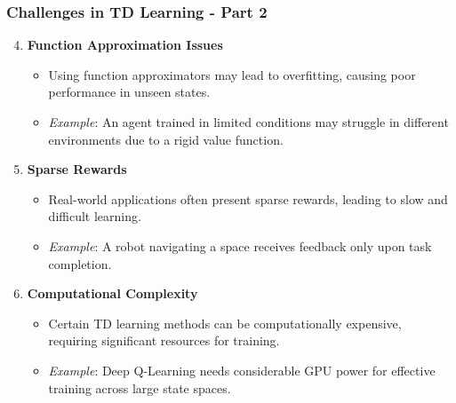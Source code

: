 \documentclass[aspectratio=169]{beamer}
\begin{document}
\begin{frame}[fragile]
    \frametitle{Challenges in TD Learning - Part 2}
    \begin{enumerate}
        \setcounter{enumi}{3}
        \item \textbf{Function Approximation Issues}
        \begin{itemize}
            \item Using function approximators may lead to overfitting, causing poor performance in unseen states.
            \item \textit{Example}: An agent trained in limited conditions may struggle in different environments due to a rigid value function.
        \end{itemize}

        \item \textbf{Sparse Rewards}
        \begin{itemize}
            \item Real-world applications often present sparse rewards, leading to slow and difficult learning.
            \item \textit{Example}: A robot navigating a space receives feedback only upon task completion.
        \end{itemize}

        \item \textbf{Computational Complexity}
        \begin{itemize}
            \item Certain TD learning methods can be computationally expensive, requiring significant resources for training.
            \item \textit{Example}: Deep Q-Learning needs considerable GPU power for effective training across large state spaces.
        \end{itemize}
    \end{enumerate}
\end{frame}
\end{document}

